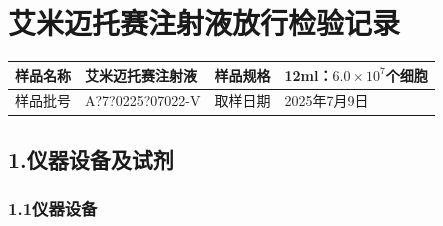 \documentclass[UTF8,10pt,a4paper,fontset=fandol]{ctexart}
\newcommand{\fieldvalue}[1]{#1}
\newcommand{\handwritten}[1]{#1}
\begin{document}
\newpage

\section*{艾米迈托赛注射液放行检验记录}

\begin{tabularx}{\textwidth}{|l|X|l|X|}
\hline
样品名称 &
\fieldvalue{艾米迈托赛注射液} &
样品规格 &
\fieldvalue{12ml：$6.0\times10^{7}$个细胞}
\\ \hline
样品批号 &
\fieldvalue{\handwritten{A?7?0225?07022-V}} &
取样日期 &
\fieldvalue{\handwritten{2025年7月9日}}
\\ \hline
\end{tabularx}

\subsection*{1.\quad 仪器设备及试剂}

\subsubsection*{1.1\quad 仪器设备}
\end{document}
